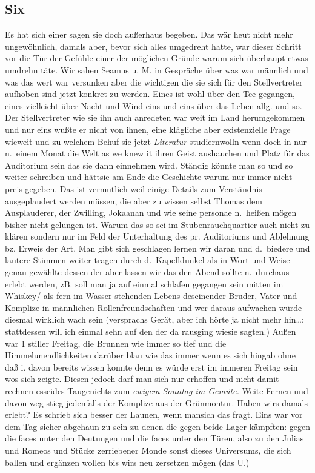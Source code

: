 \documentclass[
]{article}
\author{}
\date{\vspace{-2.5em}}
\begin{document}
\subsection{Six}\label{six}

Es hat sich einer sagen sie doch außerhaus begeben. Das wär heut nicht
mehr ungewöhnlich, damals aber, bevor sich alles umgedreht hatte, war
dieser Schritt vor die Tür der Gefühle einer der möglichen Gründe warum
sich überhaupt etwas umdrehn täte. Wir sahen Seamus u. M. in Gespräche
über was war männlich und was das wert war versunken aber die wichtigen
die sie sich für den Stellvertreter aufhoben sind jetzt konkret zu
werden. Eines ist wohl über den Tee gegangen, eines vielleicht über
Nacht und Wind eins und eins über das Leben allg. und so. Der
Stellvertreter wie sie ihn auch anredeten war weit im Land herumgekommen
und nur eins wußte er nicht von ihnen, eine klägliche aber existenzielle
Frage wieweit und zu welchem Behuf sie jetzt \emph{Literatur}
studiernwolln wenn doch in nur n.~einem Monat die Welt as we knew it
ihren Geist aushauchen und Platz für das Auditorium sein das sie dann
einnehmen wird. Ständig könnte man so und so weiter schreiben und
hättsie am Ende die Geschichte warum nur immer nicht preis gegeben. Das
ist vermutlich weil einige Details zum Verständnis ausgeplaudert werden
müssen, die aber zu wissen selbst Thomas dem Ausplauderer, der Zwilling,
Jokaanan und wie seine personae n.~heißen mögen bisher nicht gelungen
ist. Warum das so sei im Stubenrauchquartier auch nicht zu klären
sondern nur im Feld der Unterhaltung des pr. Auditoriums und Ablehnung
bz. Erweis der Art. Man gibt sich geschlagen lernen wir daran und
d.~biedere und lautere Stimmen weiter tragen durch d.~Kapelldunkel als
in Wort und Weise genau gewählte dessen der aber lassen wir das den
Abend sollte n.~durchaus erlebt werden, zB. soll man ja auf einmal
schlafen gegangen sein mitten im Whiskey/ als fern im Wasser stehenden
Lebens deseinender Bruder, Vater und Komplize in männlichen
Rollenfreundschaften und wer daraus aufwachen würde diesmal wirklich
wach sein (versprachs Gerät, aber ich hörte ja nicht mehr hin\ldots:
stattdessen will ich einmal sehn auf den der da rausging wiesie sagten.)
Außen war 1 stiller Freitag, die Brunnen wie immer so tief und die
Himmelunendlichkeiten darüber blau wie das immer wenn es sich hingab
ohne daß i. davon bereits wissen konnte denn es würde erst im immeren
Freitag sein wos sich zeigte. Diesen jedoch darf man sich nur erhoffen
und nicht damit rechnen esseides Taugenichts zum \emph{ewigem Sonntag im
Gemüte.} Weite Fernen und davon weg stieg jedenfalls der Komplize aus
der Grünmontur. Haben wirs damals erlebt? Es schrieb sich besser der
Launen, wenn mansich das fragt. Eins war vor dem Tag sicher abgehaun zu
sein zu denen die gegen beide Lager kämpften: gegen die faces unter den
Deutungen und die faces unter den Türen, also zu den Julias und Romeos
und Stücke zerriebener Monde sonst dieses Universums, die sich ballen
und ergänzen wollen bis wirs neu zersetzen mögen (das U.)
\end{document}
